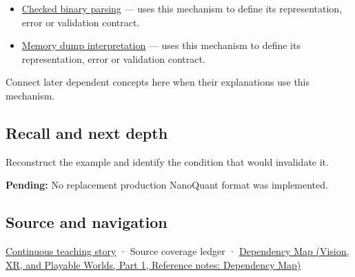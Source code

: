 \hypertarget{appendix-590bbb2424c1-used-by}{}

\begin{itemize}
\tightlist
\item
  \hyperref[appendix-652d81568de9]{Checked binary parsing} --- uses this mechanism to define its representation, error or validation contract.
\item
  \hyperref[appendix-230b59c0676b]{Memory dump interpretation} --- uses this mechanism to define its representation, error or validation contract.
\end{itemize}

Connect later dependent concepts here when their explanations use this mechanism.

\subsection{Recall and next depth}\label{appendix-590bbb2424c1-recall-and-next-depth}

\hypertarget{appendix-590bbb2424c1-recall-and-next-depth}{}

Reconstruct the example and identify the condition that would invalidate it.

\textbf{Pending:} No replacement production NanoQuant format was implemented.

\subsection{Source and navigation}\label{appendix-590bbb2424c1-source-and-navigation}

\hypertarget{appendix-590bbb2424c1-source-and-navigation}{}

\hyperref[01-foundations-i-ch002-bytes-become-a-durable-agreement]{Continuous teaching story} · {Source coverage ledger} · \href{../07-Vision-XR-and-Playable-Worlds-P01/main.pdf\#appendix-4ad47bdd269a}{Dependency Map (Vision, XR, and Playable Worlds, Part 1, Reference notes: Dependency Map)}
